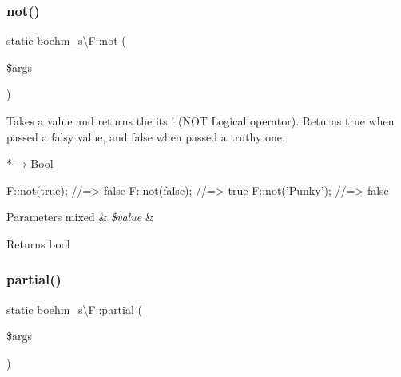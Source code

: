 \subsubsection{\texorpdfstring{not()}{not()}}
{\footnotesize\ttfamily static boehm\+\_\+s\textbackslash{}\+F\+::not (\begin{DoxyParamCaption}\item[{}]{\$args }\end{DoxyParamCaption})\hspace{0.3cm}{\ttfamily [static]}}

Takes a value and returns the it\textquotesingle{}s {\ttfamily !} (N\+OT Logical operator). Returns true when passed a falsy value, and false when passed a truthy one.


\begin{DoxyCode}
* → Bool 
\end{DoxyCode}
 
\begin{DoxyCodeInclude}
\hyperlink{classboehm__s_1_1F_a0cf3df6448dbfa748f755494974d13ab}{F::not}(\textcolor{keyword}{true}); \textcolor{comment}{//=> false}
\hyperlink{classboehm__s_1_1F_a0cf3df6448dbfa748f755494974d13ab}{F::not}(\textcolor{keyword}{false}); \textcolor{comment}{//=> true}
\hyperlink{classboehm__s_1_1F_a0cf3df6448dbfa748f755494974d13ab}{F::not}(\textcolor{stringliteral}{'Punky'}); \textcolor{comment}{//=> false}
\end{DoxyCodeInclude}
 
\begin{DoxyParams}[1]{Parameters}
mixed & {\em \$value} & \\
\hline
\end{DoxyParams}
\begin{DoxyReturn}{Returns}
bool 
\end{DoxyReturn}
\mbox{\label{classboehm__s_1_1F_ab29a37d2aca75028895148da5da15b4b}} 
\subsubsection{\texorpdfstring{partial()}{partial()}}
{\footnotesize\ttfamily static boehm\+\_\+s\textbackslash{}\+F\+::partial (\begin{DoxyParamCaption}\item[{}]{\$args }\end{DoxyParamCaption})\hspace{0.3cm}{\ttfamily [static]}}

